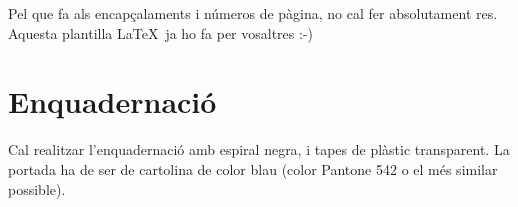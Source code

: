 Pel que fa als encapçalaments i números de pàgina, no cal fer absolutament res. Aquesta plantilla \LaTeX \ ja ho fa per vosaltres :-)


\section{Enquadernació}

Cal realitzar l'enquadernació amb espiral negra, i tapes de plàstic transparent. La portada ha de ser de cartolina de color blau (color Pantone 542 o el més similar possible).
